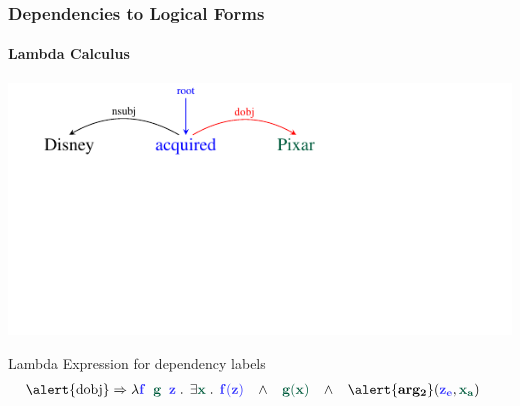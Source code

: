 \documentclass[mathserif,12pt]{beamer}
\newcommand{\hlight}[1]{{\color{blue!80} #1}}
\renewcommand{\land}{\wedge}
\newcommand{\lspace}{.\,}
\begin{document}
\begin{frame}
\frametitle{Dependencies to Logical Forms}
\framesubtitle{Lambda Calculus}
\vspace{-2.4em}
\begin{center}
\includegraphics[trim=2em 9.4em 10em 0em,clip=true,scale=1.3]{figures/pixar_dobj}

\end{center}

\vspace{1cm}

\begin{block}{\centering Lambda Expression for dependency labels}
\vspace{-0.5cm}
\begin{align*}
  \hbox{\alert{dobj}} & \Rightarrow  \lambda \hlight{\mathbf{f}}\;\; {\color{blue!40!green!60!black} \mathbf{g}}\;\; \hlight{\mathbf{z}}\; \lspace \; \exists {\color{blue!40!green!60!black} \mathbf{x}}\; \lspace \; \hlight{\mathbf{f(z)}}\;\;\; \land \;\;\; {\color{blue!40!green!60!black} \mathbf{g(x)}}  \;\;\; \land\;\;\; \alert{\mathbf{arg_2}}(\hlight{\mathbf{z_e}}, {\color{blue!40!green!60!black} \mathbf{x_a}})
\end{align*}
\vspace{-0.5cm}
\end{block}
\end{frame}
\end{document}
